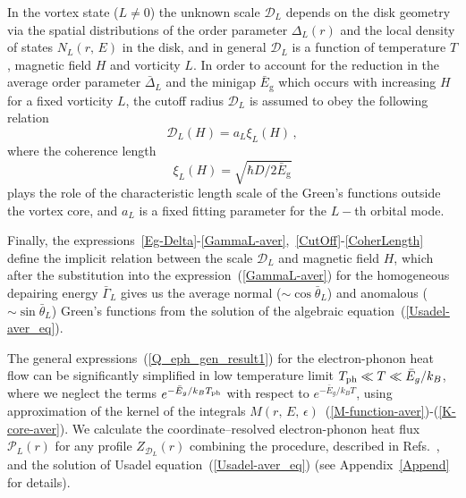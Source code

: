 \documentclass[prx,twocolumn,aps,superscriptaddress,showpacs,amsmath,amssymb,footnoteinbib]{revtex4-1}
\begin{document}
In the vortex state ($L \ne 0$) the unknown scale $\mathcal{D}_L$
depends on the disk geometry via the spatial distributions of the order
parameter $\Delta_L(r)$ and the local density of states
$N_L(r,\,E)$ in the disk, and in general $\mathcal{D}_L$ is a
function of temperature $T$, magnetic field $H$ and vorticity $L$.
In order to account for the reduction in the average order
parameter $\bar{\Delta}_L$ and the minigap $\bar{E}_\mathrm{g}$
which occurs with increasing $H$ for a fixed vorticity $L$, the
cutoff radius $\mathcal{D}_L$ is assumed to obey the following
relation
%
\begin{equation}\label{CutOff}
    \mathcal{D}_L(H) = a_L \xi_L(H)\,,
\end{equation}
%
where the coherence length
%
\begin{equation}\label{CoherLength}
    \xi_L(H) = \sqrt{\hbar D  / 2 \bar{E}_\mathrm{g}}
\end{equation}
%
plays the role of the characteristic length scale of the Green's
functions outside the vortex core, and $a_L$ is a fixed fitting
parameter for the $L-$th orbital mode.

Finally, the expressions~\eqref{Eg-Delta}-\eqref{GammaL-aver},~\eqref{CutOff}-\eqref{CoherLength}
define the implicit relation between the scale $\mathcal{D}_L$ and
magnetic field $H$, which after the substitution into the
expression~(\ref{GammaL-aver}) for the homogeneous depairing
energy $\bar{\Gamma}_L$ gives us the average normal ($\sim
\cos\bar{\theta}_L$) and anomalous ($\sim \sin\bar{\theta}_L$)
Green's functions from the solution of the algebraic equation~(\ref{Usadel-aver_eq}).


The general expressions~(\ref{Q_eph_gen_result1}) for the
electron-phonon heat flow can be significantly simplified in low
temperature limit $T_{\rm ph} \ll T \ll \bar{E}_g/k_B$, where we neglect the
terms $e^{-\bar{E}_g / k_B T_{\rm ph}}$ with respect to $e^{-\bar{E}_g
/ k_B T}$, using approximation of the kernel of the integrals
$M(r,\,E,\,\epsilon)$~(\ref{M-function-aver})-(\ref{K-core-aver}).
We calculate the coordinate--resolved electron-phonon heat flux
$\mathcal{P}_L(r)$ for any profile $Z_{\mathcal{D}_L}(r)$
combining the procedure, described in
Refs.~\cite{Kopnin-NeqSc,Timofeev-prl09}, and the solution of
Usadel equation~(\ref{Usadel-aver_eq}) (see Appendix~\ref{Append}
for details).
\end{document}
